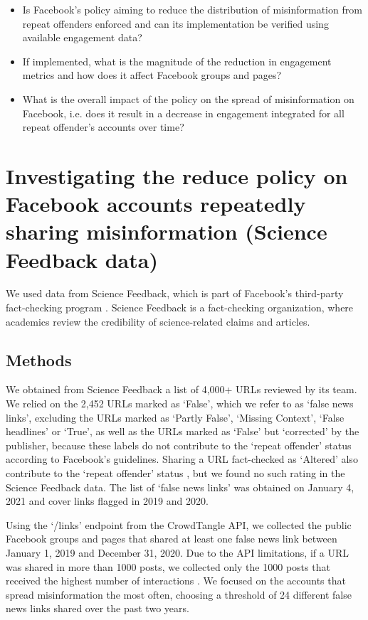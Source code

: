 \documentclass[review]{elsarticle}
\begin{document}
\begin{itemize}
\item Is Facebook’s policy aiming to reduce the distribution of misinformation from repeat offenders enforced and can its implementation be verified using available engagement data?
\item If implemented, what is the magnitude of the reduction in engagement metrics and how does it affect Facebook groups and pages?
\item What is the overall impact of the policy on the spread of misinformation on Facebook, i.e. does it result in a  decrease in engagement integrated for all repeat offender’s accounts over time?
\end{itemize}

\section{Investigating the reduce policy on Facebook accounts repeatedly sharing misinformation (Science Feedback data)}

We used data from Science Feedback, which is part of Facebook’s third-party fact-checking program \cite{sciencefeedbackFbPartner}. 
Science Feedback is a fact-checking organization, where academics review the credibility of science-related claims and articles.

\subsection{Methods}

We obtained from Science Feedback a list of 4,000+ URLs reviewed by its team. 
We relied on the 2,452 URLs marked as `False', which we refer to as `false news links', excluding the URLs marked as `Partly False', `Missing Context', `False headlines' or `True', as well as the URLs marked as `False' but `corrected' by the publisher, because these labels do not contribute to the `repeat offender' status according to Facebook's guidelines.
Sharing a URL fact-checked as `Altered' also contribute to the `repeat offender' status \citep{factCheckingRules, repeatOffenderCommunication}, but we found no such rating in the Science Feedback data.
The list of `false news links' was obtained on January 4, 2021 and cover links flagged in 2019 and 2020.

Using the `/links' endpoint from the CrowdTangle API, we collected the public Facebook groups and pages that shared at least one false news link between January 1, 2019 and December 31, 2020. 
Due to the API limitations, if a URL was shared in more than 1000 posts, we collected only the 1000 posts that received the highest number of interactions \cite{docCT}. 
We focused on the accounts that spread misinformation the most often, choosing a threshold of 24 different false news links shared over the past two years.  
\end{document}
